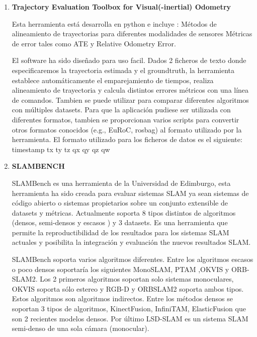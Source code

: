 \begin {enumerate}


\item \textbf{Trajectory Evaluation Toolbox for Visual(-inertial) Odometry}

Esta herramienta está desarrolla en python e incluye : 
Métodos de alineamiento de trayectorias para diferentes modalidades de sensores
Métricas de error tales como ATE y Relative Odometry Error. \cite{Zhang18iros}

El software ha sido diseñado para uso facil. Dados 2 ficheros de texto donde especificaremos la trayectoria estimada y el groundtruth, la herramienta establece automáticamente el emparejamiento de tiempos, realiza alineamiento de trayectoria y calcula distintos errores métricos con una línea de comandos. Tambien se puede utilizar para comparar diferentes algoritmos con múltiples datasets. Para que la aplicación pudiese ser utilizada con diferentes formatos, tambien se proporcionan varios scripts para convertir otros formatos conocidos (e.g., EuRoC, rosbag) al formato utilizado por la herramienta.
El formato utilizado para los ficheros de datos es el siguiente: timestamp tx ty tz qx qy qz qw

\item \textbf{SLAMBENCH}

SLAMBench es una herramienta de la Universidad de Edimburgo, esta herramienta ha sido creada para evaluar sistemas SLAM ya sean sistemas de código abierto o sistemas propietarios sobre un conjunto extensible de datasets y métricas. \cite{Bodin2018}
Actualmente soporta 8 tipos distintos de algoritmos (densos, semi-densos y escasos ) y 3 datasets. Es una herramienta que permite la reproductibilidad de los resultados para los sistemas SLAM actuales y posibilita la integración y evaluación the nuevos resultados SLAM.

SLAMBench soporta varios algoritmos diferentes. Entre los algoritmos escasos o poco densos soportaría los siguientes MonoSLAM, PTAM ,OKVIS y ORB-SLAM2. Los 2 primeros algoritmos soportan solo sistemas monoculares, OKVIS soporta sólo estereo y RGB-D y ORBSLAM2 soporta ambos tipos. Estos algoritmos son algoritmos indirectos.
Entre los métodos densos se soportan 3 tipos de algoritmos, KinectFusion, InfiniTAM, ElasticFusion que son 2 recientes modelos densos. Por último LSD-SLAM es un sistema SLAM semi-denso de una sola cámara (monocular).


\end{enumerate}
